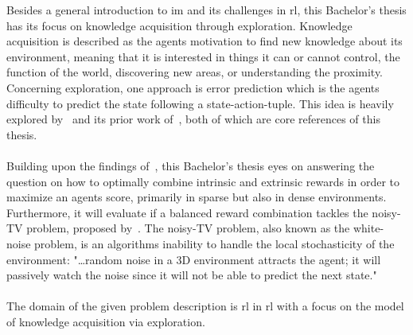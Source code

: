 \documentclass[draft,final]{vutinfth} %
\newcommand{\p}[1]{see p. #1}
\begin{document}
    Besides a general introduction to \gls{im} and its challenges in \gls{rl}, this Bachelor's thesis has its focus on knowledge acquisition through exploration.
    Knowledge acquisition is described as the agents motivation to find new knowledge about its environment, meaning that it is interested in things it can or cannot control, the function of the world, discovering new areas, or understanding the proximity.
    Concerning exploration, one approach is error prediction which is the agents difficulty to predict the state following a state-action-tuple.
    This idea is heavily explored by~\cite{burda_large-scale_2018-1} and its prior work of~\cite{pathak_curiosity-driven_2017-1}, both of which are core references of this thesis.
    \\\\
    Building upon the findings of~\citeauthor{burda_large-scale_2018-1}, this Bachelor's thesis eyes on answering the question on how to optimally combine intrinsic and extrinsic rewards in order to maximize an agents score, primarily in sparse but also in dense environments.
    Furthermore, it will evaluate if a balanced reward combination tackles the noisy-TV problem, proposed by~\cite{schmidhuber_formal_2010-1}.
    The noisy-TV problem, also known as the white-noise problem, is an algorithms inability to handle the local stochasticity of the environment: "\ldots random noise in a 3D environment attracts the agent; it will passively watch the noise since it will not be able to predict the next state."\cite[\p{10}]{aubret_survey_2019}
    \\\\
    The domain of the given problem description is \gls{rl} in \gls{rl} with a focus on the model of knowledge acquisition via exploration.
\end{document}
